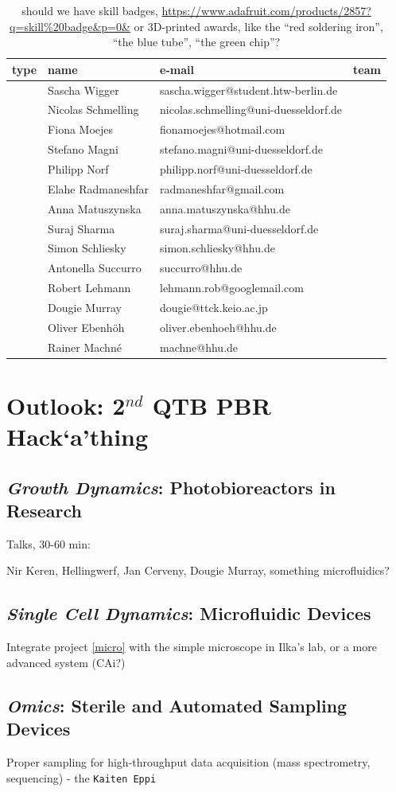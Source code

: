 \documentclass[12pt,a4paper]{scrartcl}
\newcommand{\hack}[0]{Hack`a'thing}
\begin{document}
\begin{table}[ht!]
  \begin{tabular}{lllc}
    \bf type & \bf name & \bf e-mail & \bf team \\\hline
    & Sascha Wigger & sascha.wigger@student.htw-berlin.de&\\
    & Nicolas Schmelling & nicolas.schmelling@uni-duesseldorf.de&\\
    & Fiona Moejes & fionamoejes@hotmail.com &\\
    & Stefano Magni & stefano.magni@uni-duesseldorf.de&\\
    & Philipp Norf & philipp.norf@uni-duesseldorf.de&\\
    & Elahe Radmaneshfar & radmaneshfar@gmail.com&\\
    & Anna Matuszynska & anna.matuszynska@hhu.de&\\
    & Suraj Sharma & suraj.sharma@uni-duesseldorf.de&\\
    & Simon Schliesky & simon.schliesky@hhu.de&\\
    & Antonella Succurro & succurro@hhu.de& \\
    & Robert Lehmann & lehmann.rob@googlemail.com &\\
    & Dougie Murray & dougie@ttck.keio.ac.jp&\\
    & Oliver Ebenh\"oh & oliver.ebenhoeh@hhu.de& \\
    & Rainer Machn\'e & machne@hhu.de& 
  \end{tabular}
  \caption[]{should we have skill badges, \url{https://www.adafruit.com/products/2857?q=skill\%20badge&p=0&} or 3D-printed awards, like the ``red soldering iron'', ``the blue tube'', ``the green chip''?}
\end{table}

\section{Outlook: 2$^{nd}$ QTB PBR \hack{}}

\subsection{\textit{Growth Dynamics}: Photobioreactors in Research}

Talks, 30-60 min:

Nir Keren, Hellingwerf, Jan Cerveny, Dougie Murray,
something microfluidics?

\subsection{\textit{Single Cell Dynamics}: Microfluidic Devices}
Integrate project \ref{micro} with the simple microscope in
Ilka's lab, or a more advanced system (CAi?)


\subsection{\textit{Omics}: Sterile and Automated Sampling Devices}

Proper sampling for high-throughput data acquisition (mass
spectrometry, sequencing) - the \texttt{Kaiten Eppi}
\end{document}
